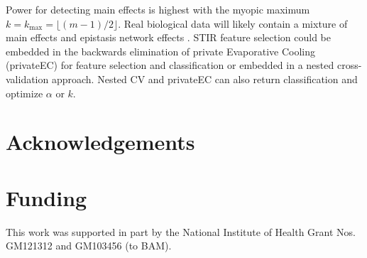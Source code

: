 \documentclass[10pt]{article}
\begin{document}
Power for detecting main effects is highest with the myopic maximum $k=k_{\text{max}}=\lfloor (m-1)/2\rfloor$. Real biological data will likely contain a mixture of main effects and epistasis network effects \cite{mckinney_pajewski}. STIR feature selection could be embedded in the backwards elimination of private Evaporative Cooling (privateEC) for feature selection and classification \cite{le17} or embedded in a nested cross-validation approach. Nested CV and privateEC can also return classification and optimize $\alpha$ or $k$. 

\section*{Acknowledgements}

\section*{Funding}
This work was supported in part by the National Institute of Health Grant Nos. GM121312 and GM103456 (to BAM). 


%

\end{document}
